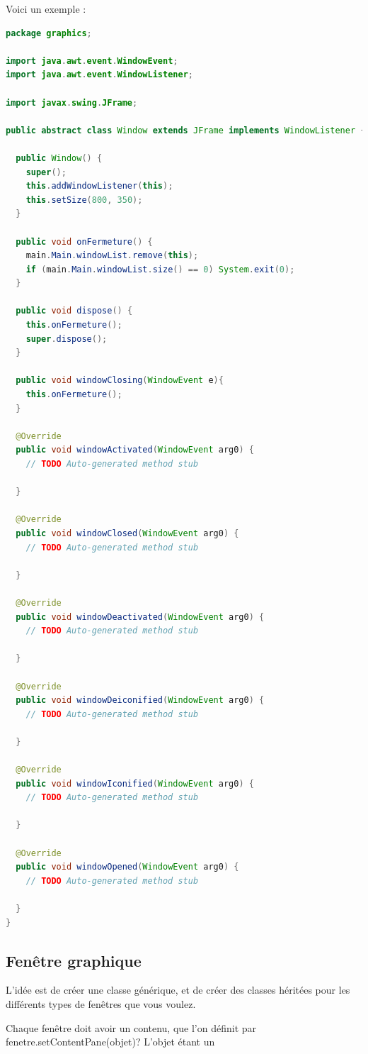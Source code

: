 \documentclass[a4paper,twoside]{article}
\begin{document}
Voici un exemple : 
\begin{lstlisting}[language=java]
package graphics;

import java.awt.event.WindowEvent;
import java.awt.event.WindowListener;

import javax.swing.JFrame;

public abstract class Window extends JFrame implements WindowListener {
  
  public Window() {
    super();
    this.addWindowListener(this);
    this.setSize(800, 350);
  }	

  public void onFermeture() {
    main.Main.windowList.remove(this);
    if (main.Main.windowList.size() == 0) System.exit(0);
  }

  public void dispose() {
    this.onFermeture();
    super.dispose();
  }

  public void windowClosing(WindowEvent e){
    this.onFermeture();
  }

  @Override
  public void windowActivated(WindowEvent arg0) {
    // TODO Auto-generated method stub

  }

  @Override
  public void windowClosed(WindowEvent arg0) {
    // TODO Auto-generated method stub

  }

  @Override
  public void windowDeactivated(WindowEvent arg0) {
    // TODO Auto-generated method stub

  }

  @Override
  public void windowDeiconified(WindowEvent arg0) {
    // TODO Auto-generated method stub

  }

  @Override
  public void windowIconified(WindowEvent arg0) {
    // TODO Auto-generated method stub

  }

  @Override
  public void windowOpened(WindowEvent arg0) {
    // TODO Auto-generated method stub

  }
}
\end{lstlisting}

\subsection{Fenêtre graphique}
L'idée est de créer une classe générique, et de créer des classes héritées pour les différents types de fenêtres que vous voulez. 

Chaque fenêtre doit avoir un contenu, que l'on définit par fenetre.setContentPane(objet)? L'objet étant un %
\end{document}
